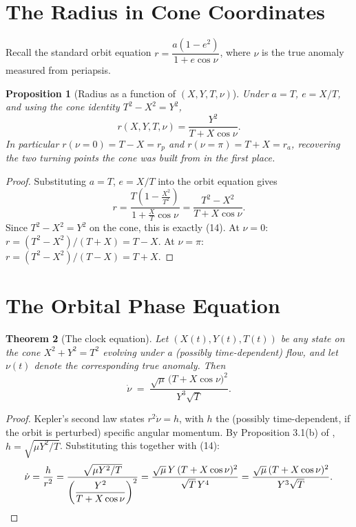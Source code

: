 \documentclass[12pt]{amsart}
\theoremstyle{plain}
\newtheorem{theorem}{Theorem}[section]
\newtheorem{proposition}[theorem]{Proposition}
\theoremstyle{remark}
\begin{document}
\section{The Radius in Cone Coordinates}

Recall the standard orbit equation $r=\dfrac{a(1-e^2)}{1+e\cos\nu}$, where $\nu$ is the true anomaly measured from periapsis.

\begin{proposition}[Radius as a function of $(X,Y,T,\nu)$]
Under $a=T$, $e=X/T$, and using the cone identity $T^2-X^2=Y^2$,
\begin{equation}
r(X,Y,T,\nu)=\frac{Y^2}{T+X\cos\nu}. \tag{14}
\end{equation}
In particular $r(\nu=0)=T-X=r_p$ and $r(\nu=\pi)=T+X=r_a$, recovering the two turning points the cone was built from in the first place.
\end{proposition}

\begin{proof}
Substituting $a=T$, $e=X/T$ into the orbit equation gives
\[
r=\frac{T\left(1-\frac{X^2}{T^2}\right)}{1+\frac{X}{T}\cos\nu}=\frac{T^2-X^2}{T+X\cos\nu}.
\]
Since $T^2-X^2=Y^2$ on the cone, this is exactly (14). At $\nu=0$: $r=(T^2-X^2)/(T+X)=T-X$. At $\nu=\pi$: $r=(T^2-X^2)/(T-X)=T+X$.
\end{proof}

\section{The Orbital Phase Equation}

\begin{theorem}[The clock equation]
Let $(X(t),Y(t),T(t))$ be any state on the cone $X^2+Y^2=T^2$ evolving under a (possibly time-dependent) flow, and let $\nu(t)$ denote the corresponding true anomaly. Then
\begin{equation}
\dot\nu \;=\; \frac{\sqrt{\mu}\,\bigl(T+X\cos\nu\bigr)^{2}}{Y^{3}\sqrt{T}}. \tag{15}
\end{equation}
\end{theorem}

\begin{proof}
Kepler's second law states $r^2\dot\nu=h$, with $h$ the (possibly time-dependent, if the orbit is perturbed) specific angular momentum. By Proposition 3.1(b) of \cite{Ebert2026Cone}, $h=\sqrt{\mu Y^2/T}$. Substituting this together with (14):
\[
\dot\nu=\frac{h}{r^2}=\frac{\sqrt{\mu Y^2/T}}{\left(\dfrac{Y^2}{T+X\cos\nu}\right)^{2}}=\frac{\sqrt{\mu}\,Y\,(T+X\cos\nu)^2}{\sqrt{T}\,Y^4}=\frac{\sqrt{\mu}\,(T+X\cos\nu)^2}{Y^3\sqrt{T}}. \qedhere
\]
\end{proof}
\end{document}
